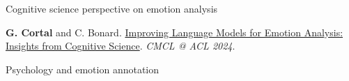 \documentclass[handout,10pt]{beamer}
\begin{document}
\begin{frame}{}
    \vfill
    \begin{center}
        \Large Cognitive science perspective on emotion analysis
    \end{center}
    \vfill

    \footnotesize
    \textbf{G. Cortal} and C. Bonard. \href{https://aclanthology.org/2024.cmcl-1.23/}{Improving Language Models for Emotion Analysis: Insights from Cognitive Science}. \textit{CMCL @ ACL 2024}.
\end{frame}

\begin{frame}{Psychology and emotion annotation}








\end{frame}
\end{document}

